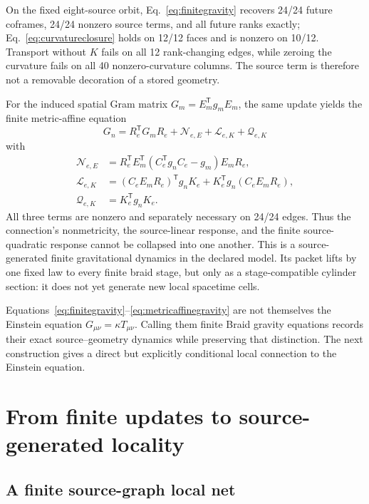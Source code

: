 On the fixed eight-source orbit, Eq.~\eqref{eq:finitegravity} recovers 24/24 future coframes, 24/24 nonzero source terms, and all future ranks exactly; Eq.~\eqref{eq:curvatureclosure} holds on 12/12 faces and is nonzero on 10/12. Transport without $K$ fails on all 12 rank-changing edges, while zeroing the curvature fails on all 40 nonzero-curvature columns. The source term is therefore not a removable decoration of a stored geometry.

For the induced spatial Gram matrix $G_m=E_m^{\mathsf T}g_mE_m$, the same update yields the finite metric-affine equation
\begin{equation}\label{eq:metricaffinegravity}
 \boxed{
 G_n=R_e^{\mathsf T}G_mR_e
 +\mathcal N_{e,E}+\mathcal L_{e,K}+\mathcal Q_{e,K}}
\end{equation}
with
\begin{align}
 \mathcal N_{e,E}
 &=R_e^{\mathsf T}E_m^{\mathsf T}
   (C_e^{\mathsf T}g_nC_e-g_m)E_mR_e,\\
 \mathcal L_{e,K}
 &=(C_eE_mR_e)^{\mathsf T}g_nK_e
   +K_e^{\mathsf T}g_n(C_eE_mR_e),\\
 \mathcal Q_{e,K}&=K_e^{\mathsf T}g_nK_e.
\end{align}
All three terms are nonzero and separately necessary on 24/24 edges. Thus the connection's nonmetricity, the source-linear response, and the finite source-quadratic response cannot be collapsed into one another. This is a source-generated finite gravitational dynamics in the declared model. Its packet lifts by one fixed law to every finite braid stage, but only as a stage-compatible cylinder section: it does not yet generate new local spacetime cells.

Equations~\eqref{eq:finitegravity}--\eqref{eq:metricaffinegravity} are not themselves the Einstein equation $G_{\mu\nu}=\kappa T_{\mu\nu}$. Calling them finite Braid gravity equations records their exact source--geometry dynamics while preserving that distinction. The next construction gives a direct but explicitly conditional local connection to the Einstein equation.

\section{From finite updates to source-generated locality}

\subsection{A finite source-graph local net}

